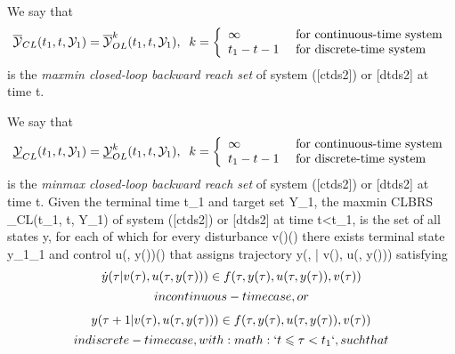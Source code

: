 \documentclass[letterpaper,10pt,english]{sphinxmanual}
\begin{document}
We say that
\begin{gather}
\begin{split}\overline{{\mathcal Y}}_{CL}(t_1, t, {\mathcal Y}_1) = \overline{{\mathcal Y}}_{OL}^k(t_1, t, {\mathcal Y}_1), \;\;
k = \left\{\begin{array}{ll}
\infty & \mbox{ for continuous-time system}\\
t_1-t-1 & \mbox{ for discrete-time system}\end{array}\right.
\label{maxminclbrs}\end{split}\notag
\end{gather}
is the \emph{maxmin closed-loop backward reach set} of system ({[}ctds2{]}) or
{[}dtds2{]} at time t.

We say that
\begin{gather}
\begin{split}\underline{{\mathcal Y}}_{CL}(t_1, t, {\mathcal Y}_1) = \underline{{\mathcal Y}}_{OL}^k(t_1, t, {\mathcal Y}_1), \;\;
k = \left\{\begin{array}{ll}
\infty & \mbox{ for continuous-time system}\\
t_1-t-1 & \mbox{ for discrete-time system}\end{array}\right.
\label{minmaxclbrs}\end{split}\notag
\end{gather}
is the \emph{minmax closed-loop backward reach set} of system ({[}ctds2{]}) or
{[}dtds2{]} at time t. Given the terminal time t_1 and
target set {\mathcal Y}_1, the maxmin CLBRS
_{CL}(t_1, t, {\mathcal Y}_1) of system
({[}ctds2{]}) or {[}dtds2{]} at time t<t_1, is the set of all states
y, for each of which for every disturbance
v(\tau)(\tau) there exists terminal state
y_1_1 and control
u(\tau, y(\tau))(\tau) that assigns trajectory
y(\tau, | v(\tau), u(\tau, y(\tau))) satisfying
\begin{gather}
\begin{split}  \dot{y}(\tau | v(\tau), u(\tau, y(\tau))) \in
  f(\tau, y(\tau), u(\tau, y(\tau)), v(\tau))\end{split}\notag\\\begin{split}in continuous-time case, or\end{split}\notag
\end{gather}\begin{gather}
\begin{split}  y(\tau+1 | v(\tau), u(\tau, y(\tau))) \in
  f(\tau, y(\tau), u(\tau, y(\tau)), v(\tau))\end{split}\notag\\\begin{split}in discrete-time case, with :math:`t\leqslant\tau<t_1`, such that\end{split}\notag
\end{gather}
\end{document}

